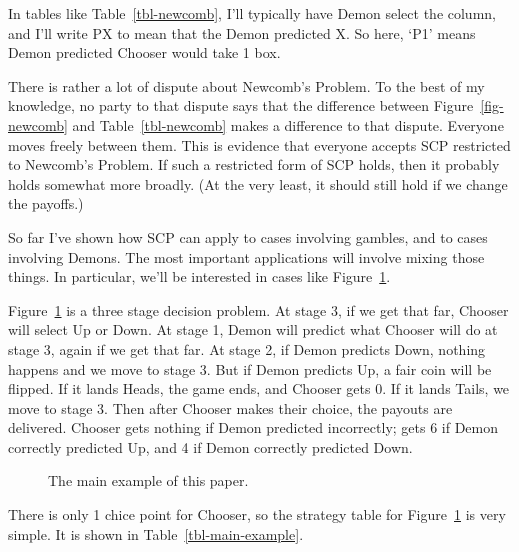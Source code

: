 \documentclass[
  10pt,
  letterpaper,
  DIV=11,
  numbers=noendperiod,
  twoside]{scrartcl}
\begin{document}
In tables like Table~\ref{tbl-newcomb}, I'll typically have Demon select
the column, and I'll write PX to mean that the Demon predicted X. So
here, `P1' means Demon predicted Chooser would take 1 box.

There is rather a lot of dispute about Newcomb's Problem. To the best of
my knowledge, no party to that dispute says that the difference between
Figure~\ref{fig-newcomb} and Table~\ref{tbl-newcomb} makes a difference
to that dispute. Everyone moves freely between them. This is evidence
that everyone accepts SCP restricted to Newcomb's Problem. If such a
restricted form of SCP holds, then it probably holds somewhat more
broadly. (At the very least, it should still hold if we change the
payoffs.)

So far I've shown how SCP can apply to cases involving gambles, and to
cases involving Demons. The most important applications will involve
mixing those things. In particular, we'll be interested in cases like
Figure~\ref{fig-main-example}.

Figure~\ref{fig-main-example} is a three stage decision problem. At
stage 3, if we get that far, Chooser will select Up or Down. At stage 1,
Demon will predict what Chooser will do at stage 3, again if we get that
far. At stage 2, if Demon predicts Down, nothing happens and we move to
stage 3. But if Demon predicts Up, a fair coin will be flipped. If it
lands Heads, the game ends, and Chooser gets 0. If it lands Tails, we
move to stage 3. Then after Chooser makes their choice, the payouts are
delivered. Chooser gets nothing if Demon predicted incorrectly; gets 6
if Demon correctly predicted Up, and 4 if Demon correctly predicted
Down.

\begin{figure}


\caption{\label{fig-main-example}The main example of this paper.}

\end{figure}%

There is only 1 chice point for Chooser, so the strategy table for
Figure~\ref{fig-main-example} is very simple. It is shown in
Table~\ref{tbl-main-example}.
\end{document}
